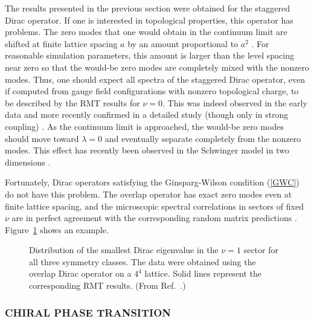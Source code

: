 The results presented in the previous section were obtained for the
staggered Dirac operator. If one is interested in topological
properties, this operator has problems. The zero modes that one would
obtain in the continuum limit are shifted at finite lattice spacing
$a$ by an amount proportional to $a^2$ \cite{Smit87}.  For reasonable
simulation parameters, this amount is larger than the level spacing
near zero so that the would-be zero modes are completely mixed with
the nonzero modes.  Thus, one should expect all spectra of the
staggered Dirac operator, even if computed from gauge field
configurations with nonzero topological charge, to be described by the
RMT results for $\nu=0$.  This was indeed observed in the early data
\cite{Verb96,Berb98a} and more recently confirmed in a detailed study
(though only in strong coupling) \cite{Damg99c}.  As the continuum
limit is approached, the would-be zero modes should move toward
$\lambda=0$ and eventually separate completely from the nonzero modes.
This effect has recently been observed in the Schwinger model in two
dimensions \cite{Farc99a}.

Fortunately, Dirac operators satisfying the Ginsparg-Wilson condition
(\ref{GWC}) do not have this problem.  The overlap
operator \cite{Neub98} has exact zero
modes even at finite lattice spacing, and the microscopic spectral
correlations in sectors of fixed $\nu$ are in perfect agreement with
the corresponding random matrix predictions
\cite{Farc98,Edwa99b,Damg99b,Hernandezmv,Tilos}.   Figure~\ref{top}
shows an example.

\begin{figure}
  \begin{center}
    \caption{Distribution of the smallest Dirac eigenvalue in the
      $\nu=1$ sector for all three symmetry classes.  The data were
      obtained using the overlap Dirac operator on a $4^4$ lattice.
      Solid lines represent the corresponding RMT results.  (From
      Ref.~\cite{Edwa99b}.)}
    \label{top}
  \end{center}
\end{figure}


\subsubsection{CHIRAL PHASE TRANSITION}
\label{sec:chphtr}

